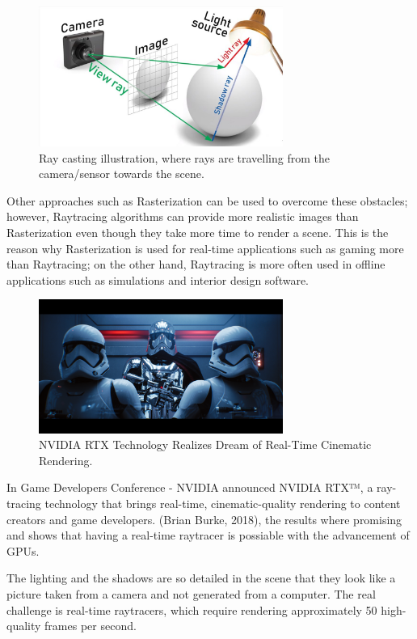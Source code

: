 \documentclass[11pt,a4paper]{article}
\begin{document}
\begin{figure}[h]	
     \centering
         \includegraphics[width=8cm]{images/raytracer_2.jpg}
        \caption{Ray casting illustration, where rays are travelling from the camera/sensor towards the scene. \protect\cite{Kimathi2020}}
        \label{fig:dice}
\end{figure}


Other approaches such as Rasterization can be used to overcome these obstacles; however, Raytracing algorithms can provide more realistic images than Rasterization even though they take more time to render a scene. This is the reason why  Rasterization is used for real-time applications such as gaming more than Raytracing; on the other hand, Raytracing is more often used in offline applications such as simulations and interior design software.
\clearpage

\begin{figure}[h]	
     \centering
         \includegraphics[width=8cm]{images/star_wars.png}
        \caption{NVIDIA RTX Technology Realizes Dream of Real-Time Cinematic Rendering.\protect\cite{Burke2018}}
        \label{fig:dice}
\end{figure}

In Game Developers Conference - NVIDIA announced NVIDIA RTX™, a ray-tracing technology that brings real-time, cinematic-quality rendering to content creators and game developers. (Brian Burke, 2018), the results where promising and shows that having a real-time raytracer is possiable with the advancement of GPUs. 

The lighting and the shadows are so detailed in the scene that they look like a picture taken from a camera and not generated from a computer. The real challenge is real-time raytracers, which require rendering approximately 50 high-quality frames per second.
\end{document}
